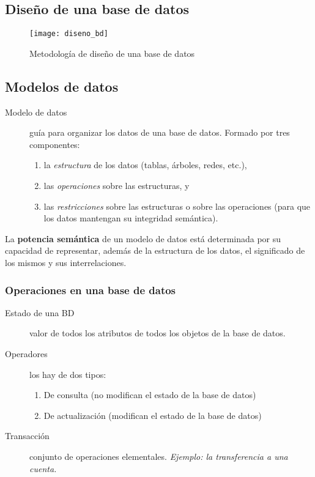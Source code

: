 \documentclass[a4paper, twoside]{article}
\newcommand{\codedir}{../resources/code} %
\begin{document}
\subsection{Diseño de una base de datos}
\begin{figure}[H]
	\centering
	\texttt{[image: diseno\_bd]}
	\caption{Metodología de diseño de una base de datos}
\end{figure}

\subsection{Modelos de datos}
\begin{description}
	\item[Modelo de datos] guía para organizar los datos de una base de datos. Formado por tres componentes: 
	\begin{enumerate}
		\item la \emph{estructura} de los datos (tablas, árboles, redes, etc.),
		\item las \emph{operaciones} sobre las estructuras, y
		\item las \emph{restricciones} sobre las estructuras o sobre las operaciones (para que los datos mantengan su integridad semántica).
	\end{enumerate}
\end{description}

La \textbf{potencia semántica} de un modelo de datos está determinada por su capacidad de representar, además de la estructura de los datos, el significado de los mismos y sus interrelaciones.

\subsubsection{Operaciones en una base de datos}
\begin{description}
	\item[Estado de una BD] valor de todos los atributos de todos los objetos de la base de datos.
	\item[Operadores] los hay de dos tipos:
	\begin{enumerate}
		\item De consulta (no modifican el estado de la base de datos)
		\item De actualización (modifican el estado de la base de datos)
	\end{enumerate}
	\item[Transacción] conjunto de operaciones elementales. \emph{Ejemplo: la transferencia a una cuenta.}
	
\end{description}
\end{document}
